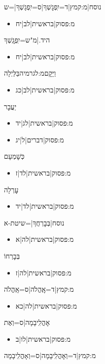 \begin{itemize}
{{{{{{{{{{ \item {{נוסח|{{מ:קמץ|ד=יִֽפְגׇשְׁךָ|ס=יִֽפְגָשְׁךָ}}|=ש
\begin{itemize} \item {{מ:פסוק|בראשית|לב|יח}}
\end{itemize}
 \item היד.|מ"ש=יִֽפְגׇֽשְׁךָ
\begin{itemize} \item {{מ:פסוק|בראשית|לב|יח}}
\end{itemize}
 \item וַיָּקׇם{{מ:לגרמיה}}בַּלַּיְלָה
\begin{itemize} \item {{מ:פסוק|בראשית|לב|כג}}
\end{itemize}
 \item יַעֲבׇר
\begin{itemize} \item {{מ:פסוק|בראשית|לג|יד}}\item {{מ:פסוק|דברים|ל|יג}}
\end{itemize}
 \item כְּשׇׁמְעָם
\begin{itemize} \item {{מ:פסוק|בראשית|לד|ז}}
\end{itemize}
 \item עׇרְלָה
\begin{itemize} \item {{מ:פסוק|בראשית|לד|יד}}
\end{itemize}
 \item {{נוסח|בְּבׇרְחֲךָ|=שיטת-א
\begin{itemize} \item {{מ:פסוק|בראשית|לה|א}}
\end{itemize}
 \item בְּבׇרְחוֹ
\begin{itemize} \item {{מ:פסוק|בראשית|לה|ז}}
\end{itemize}
 \item {{מ:קמץ|ד=אׇֽהֳלֹה|ס=אָֽהֳלֹה}}
\begin{itemize} \item {{מ:פסוק|בראשית|לה|כא}}
\end{itemize}
 \item אׇהֳלִֽיבָמָה|ס=וְאֶת
\begin{itemize} \item {{מ:פסוק|בראשית|לו|ב}}
\end{itemize}
 \item {{מ:קמץ|ד=וְאׇהֳלִֽיבָמָה|ס=וְאָהֳלִֽיבָמָה}}
}}}}}}}}}}}}}}
\end{itemize}
